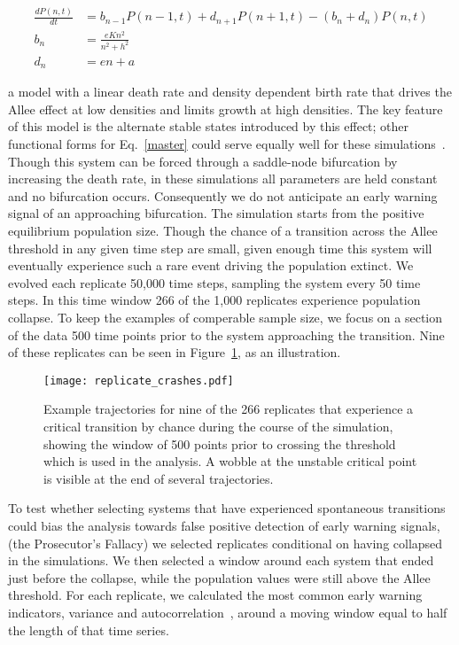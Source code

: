 \documentclass[authoryear,review,12pt]{elsarticle}
\begin{document}
\begin{align}
  \frac{dP(n,t)}{dt} &= b_{n-1} P(n-1,t) + d_{n+1}P(n+1,t) - (b_n+d_n) P(n,t)  \label{master} \\
    b_n &= \frac{e K n^2}{n^2 + h^2} \\
    d_n &= e n + a
\end{align}

a model with a linear death rate and density dependent birth rate that drives
the Allee effect at low densities and limits growth at high densities.  The
key feature of this model is the alternate stable states introduced by this effect;
other functional forms for Eq.~\ref{master} could serve equally well for these
simulations~\citep[see \emph{e.g.}][]{Scheffer2001}. 
Though this system can be forced through a saddle-node bifurcation by
increasing the death rate, in these simulations all parameters
are held constant and no bifurcation occurs.  Consequently we do not 
anticipate an early warning signal of an approaching bifurcation.
The simulation starts from the positive equilibrium population size.
Though the chance of a transition across the Allee threshold in any 
given time step are small, given enough time this system will eventually
experience such a rare event driving the population extinct.  We evolved
each replicate 50,000 time steps, sampling the system every 50 time steps.  
In this time window 266 of the 1,000 replicates experience population collapse.  
To keep the examples of comperable sample size, we focus on a section of the data
500 time points prior to the system approaching the transition.  
Nine of these replicates can be seen in Figure~\ref{fig:replicate_crashes},
as an illustration.   

  \begin{figure}
    \begin{center}
      \texttt{[image: replicate\_crashes.pdf]}
    \end{center}
    \caption{Example trajectories for nine of the 266 replicates that 
             experience a critical transition by chance during the course
             of the simulation, showing the window of 500 points prior to
             crossing the threshold which is used in the analysis.  A wobble
             at the unstable critical point is visible at the end of several 
             trajectories.}
    \label{fig:replicate_crashes}
  \end{figure}


To test whether selecting systems that have experienced spontaneous transitions
could bias the analysis towards false positive detection of early warning signals,
(the Prosecutor's Fallacy) we selected replicates conditional on having collapsed
in the simulations.
We then selected a window around each system that ended just before the
collapse, while the population values were still above the Allee threshold.
For each replicate, we calculated the most common early warning indicators, variance
and autocorrelation~\citep[\emph{e.g.}][]{Carpenter2006,Dakos2008,Scheffer2009}, 
around a moving window equal to half the length of that time series.  
\end{document}
